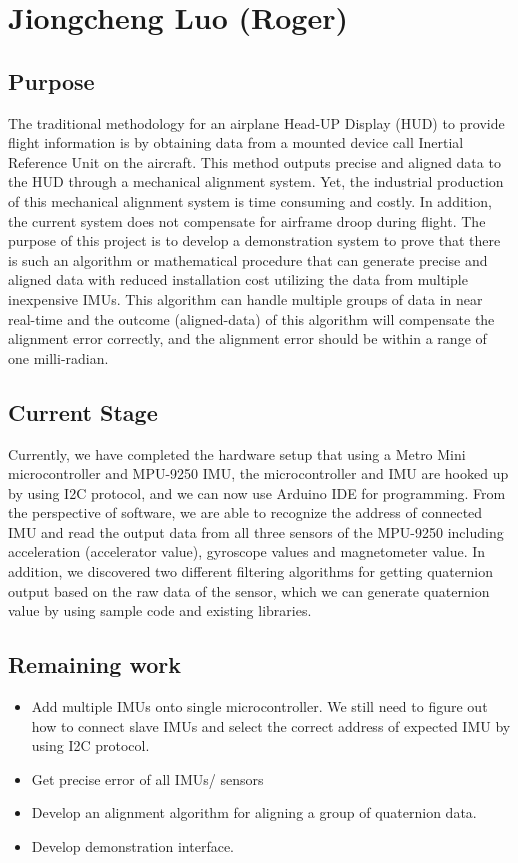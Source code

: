 \section{Jiongcheng Luo (Roger)}
\subsection{Purpose}
The traditional methodology for an airplane Head-UP Display (HUD) to provide flight information is by obtaining data from a mounted device call Inertial Reference Unit on the aircraft. This method outputs precise and aligned data to the HUD through a mechanical alignment system. Yet, the industrial production of this mechanical alignment system is time consuming and costly. In addition, the current system does not compensate for airframe droop during flight. The purpose of this project is to develop a demonstration system to prove that there is such an algorithm or mathematical procedure that can generate precise and aligned data with reduced installation cost utilizing the data from multiple inexpensive IMUs. This algorithm can handle multiple groups of data in near real-time and the outcome (aligned-data) of this algorithm will compensate the alignment error correctly, and the alignment error should be within a range of one milli-radian.

\subsection{Current Stage}
Currently, we have completed the hardware setup that using a Metro Mini microcontroller and MPU-9250 IMU, the microcontroller and IMU are hooked up by using I2C protocol, and we can now use Arduino IDE for programming. From the perspective of software, we are able to recognize the address of connected IMU and read the output data from all three sensors of the MPU-9250 including acceleration (accelerator value), gyroscope values and magnetometer value. 
In addition, we discovered two different filtering algorithms for getting quaternion output based on the raw data of the sensor, which we can generate quaternion value by using sample code and existing libraries. 

\subsection{Remaining work}
\begin{itemize}
	\item Add multiple IMUs onto single microcontroller. We still need to figure out how to connect slave IMUs and select the correct address of expected IMU by using I2C protocol. 
	\item Get precise error of all IMUs/ sensors
	\item Develop an alignment algorithm for aligning a group of quaternion data.
	\item Develop demonstration interface.
\end{itemize}

